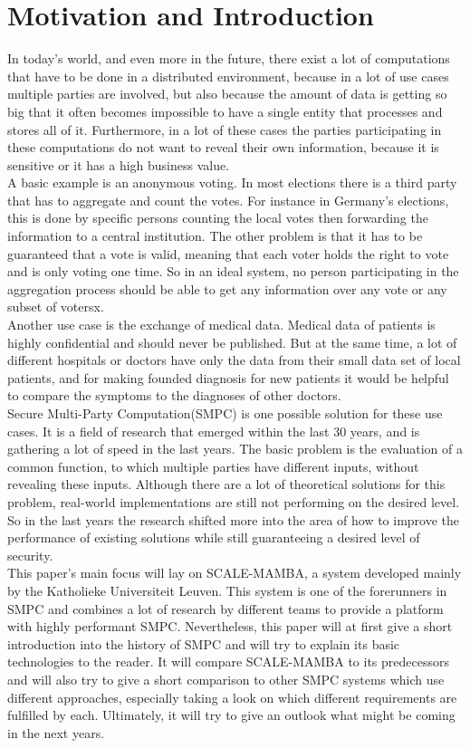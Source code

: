 \documentclass[english,runningheads,a4paper]{llncs}[2018/03/10]
\begin{document}
\section{Motivation and Introduction}\label{sec:intromoti}
In today's world, and even more in the future, there exist a lot of computations that have to be done in a distributed environment, because in a lot of use cases multiple parties are involved, but also because the amount of data is getting so big that it often becomes impossible to have a single entity that processes and stores all of it. Furthermore, in a lot of these cases the parties participating in these computations do not want to reveal their own information, because it is sensitive or it has a high business value.\\
A basic example is an anonymous voting. In most elections there is a third party that has to aggregate and count the votes. For instance in Germany's elections, this is done by specific persons counting the local votes then forwarding the information to a central institution. The other problem is that it has to be guaranteed that a vote is valid, meaning that each voter holds the right to vote and is only voting one time. So in an ideal system, no person participating in the aggregation process should be able to get any information over any vote or any subset of votersx.\\
Another use case is the exchange of medical data. Medical data of patients is highly confidential and should never be published. But at the same time, a lot of different hospitals or doctors have only the data from their small data set of local patients, and for making founded diagnosis for new patients it would be helpful to compare the symptoms to the diagnoses of other doctors.\\
Secure Multi-Party Computation(SMPC) is one possible solution for these use cases. It is a field of research that emerged within the last 30 years, and is gathering a lot of speed in the last years. 
The basic problem is the evaluation of a common function, to which multiple parties have different inputs, without revealing these inputs. Although there are a lot of theoretical solutions for this problem, real-world implementations are still not performing on the desired level. So in the last years the research shifted more into the area of how to improve the performance of existing solutions while still guaranteeing a desired level of security.\\
This paper's main focus will lay on SCALE-MAMBA, a system developed mainly by the Katholieke Universiteit Leuven. This system is one of the forerunners in SMPC and combines a lot of research by different teams to provide a platform with highly performant SMPC. Nevertheless, this paper will at first give a short introduction into the history of SMPC and will try to explain its basic technologies to the reader. It will compare SCALE-MAMBA to its predecessors and will also try to give a short comparison to other SMPC systems which use different approaches, especially taking a look on which different requirements are fulfilled by each. Ultimately, it will try to give an outlook what might be coming in the next years.\\
\end{document}
